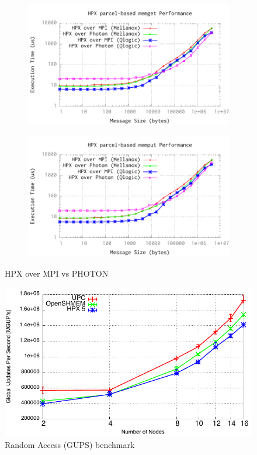 \documentclass[10pt]{article}
\begin{document}
\begin{figure}[!ht]
\centering
\begin{subfigure}[b]{0.45\textwidth}
\includegraphics[width=\textwidth]{cutter/plots/memget_mpi_photon}
\label{fig:memget-mpi-photon}
\end{subfigure}%
\begin{subfigure}[b]{0.45\textwidth}
\includegraphics[width=\textwidth]{cutter/plots/memput_mpi_photon}
\label{fig:memput-mpi-photon}
\end{subfigure}%
\caption{HPX over MPI vs PHOTON}
\label{fig:memputget}
\end{figure}

\begin{figure}[!ht]
\centering
\includegraphics[scale=0.8]{cutter/plots/guppie}
\caption{Random Access (GUPS) benchmark}
\label{fig:guppie}
\end{figure}
\end{document}
